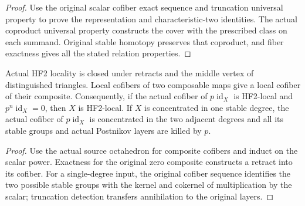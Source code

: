 \begin{proof}
  Use the original scalar cofiber exact sequence and truncation universal property to prove the representation and characteristic-two identities. The actual coproduct universal property constructs the cover with the prescribed class on each summand. Original stable homotopy preserves that coproduct, and fiber exactness gives all the stated relation properties.
  \leanok
\end{proof}

\begin{proposition}
  \label{prop:actual-locality-scalar-power-lifting}
  \leanok
  Actual HF2 locality is closed under retracts and the middle vertex of distinguished triangles. Local cofibers of two composable maps give a local cofiber of their composite. Consequently, if the actual cofiber of $p\operatorname{id}_X$ is HF2-local and $p^n\operatorname{id}_X=0$, then $X$ is HF2-local. If $X$ is concentrated in one stable degree, the actual cofiber of $p\operatorname{id}_X$ is concentrated in the two adjacent degrees and all its stable groups and actual Postnikov layers are killed by $p$.
\end{proposition}
\begin{proof}
  Use the actual source octahedron for composite cofibers and induct on the scalar power. Exactness for the original zero composite constructs a retract into its cofiber. For a single-degree input, the original cofiber sequence identifies the two possible stable groups with the kernel and cokernel of multiplication by the scalar; truncation detection transfers annihilation to the original layers.
  \leanok
\end{proof}

